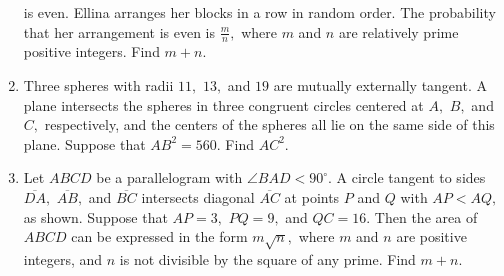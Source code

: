 \documentclass{article}
\begin{document}
\begin{enumerate}[label=\arabic*., itemsep=0.5em]
is even. Ellina arranges her blocks in a row in random order. The probability that her arrangement is even is \(\frac{m}{n},\) where \(m\) and \(n\) are relatively prime positive integers. Find \(m+n.\)\par \vspace{0.5em}\item Three spheres with radii \(11,\) \(13,\) and \(19\) are mutually externally tangent. A plane intersects the spheres in three congruent circles centered at \(A,\) \(B,\) and \(C,\) respectively, and the centers of the spheres all lie on the same side of this plane. Suppose that \(AB^2 = 560.\) Find \(AC^2.\)\par \vspace{0.5em}\item Let \(ABCD\) be a parallelogram with \(\angle BAD < 90^\circ.\) A circle tangent to sides \(\overline{DA},\) \(\overline{AB},\) and \(\overline{BC}\) intersects diagonal \(\overline{AC}\) at points \(P\) and \(Q\) with \(AP < AQ,\) as shown. Suppose that \(AP=3,\) \(PQ=9,\) and \(QC=16.\) Then the area of \(ABCD\) can be expressed in the form \(m\sqrt{n},\) where \(m\) and \(n\) are positive integers, and \(n\) is not divisible by the square of any prime. Find \(m+n.\)



\end{enumerate}
\end{document}
